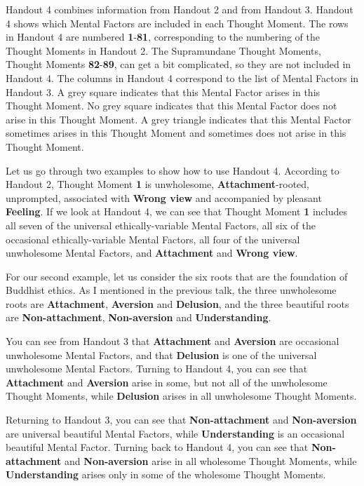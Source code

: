 Handout 4 combines information from Handout 2 and from Handout 3. Handout 4 shows which Mental Factors are included in each Thought Moment. The rows in Handout 4 are numbered \textbf{1}-\textbf{81}, corresponding to the numbering of the Thought Moments in Handout 2. The Supramundane Thought Moments, Thought Moments \textbf{82}-\textbf{89}, can get a bit complicated, so they are not included in Handout 4. The columns in Handout 4 correspond to the list of Mental Factors in Handout 3. A grey square indicates that this Mental Factor arises in this Thought Moment. No grey square indicates that this Mental Factor does not arise in this Thought Moment. A grey triangle indicates that this Mental Factor sometimes arises in this Thought Moment and sometimes does not arise in this Thought Moment.

Let us go through two examples to show how to use Handout 4. According to Handout 2, Thought Moment \textbf{1} is unwholesome, \textbf{Attachment}-rooted, unprompted, associated with \textbf{Wrong view} and accompanied by pleasant \textbf{Feeling}. If we look at Handout 4, we can see that Thought Moment \textbf{1} includes all seven of the universal ethically-variable Mental Factors, all six of the occasional ethically-variable Mental Factors, all four of the universal unwholesome Mental Factors, and \textbf{Attachment} and \textbf{Wrong view}.

For our second example, let us consider the six roots that are the foundation of Buddhist ethics. As I mentioned in the previous talk, the three unwholesome roots are \textbf{Attachment}, \textbf{Aversion} and \textbf{Delusion}, and the three beautiful roots are \textbf{Non-attachment}, \textbf{Non-aversion} and \textbf{Understanding}. 

You can see from Handout 3 that \textbf{Attachment} and \textbf{Aversion} are occasional unwholesome Mental Factors, and that \textbf{Delusion} is one of the universal unwholesome Mental Factors. Turning to Handout 4, you can see that \textbf{Attachment} and \textbf{Aversion} arise in some, but not all of the unwholesome Thought Moments, while \textbf{Delusion} arises in all unwholesome Thought Moments. 

Returning to Handout 3, you can see that \textbf{Non-attachment} and \textbf{Non-aversion} are universal beautiful Mental Factors, while \textbf{Understanding} is an occasional beautiful Mental Factor. Turning back to Handout 4, you can see that \textbf{Non-attachment} and \textbf{Non-aversion} arise in all wholesome Thought Moments, while \textbf{Understanding} arises only in some of the wholesome Thought Moments.

